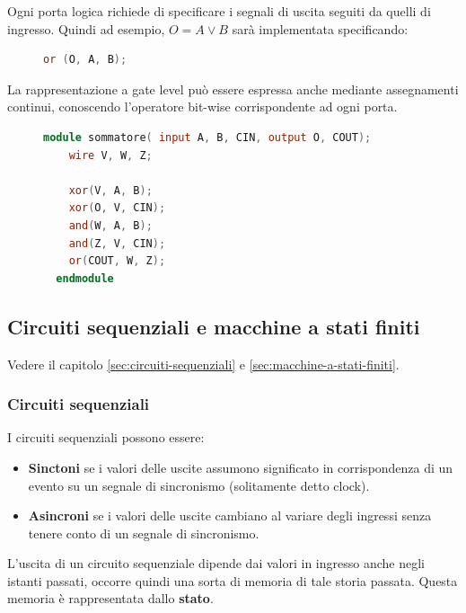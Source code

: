 \documentclass[a4paper]{article}
\theoremstyle{break}
\theoremstyle{break}
\theoremstyle{break}
\theoremstyle{break}
\begin{document}
Ogni porta logica richiede di specificare i segnali di uscita seguiti da quelli di ingresso.
Quindi ad esempio, \( O = A \vee B \) sarà implementata specificando:
\begin{figure}[H]
  \begin{lstlisting}[language=Verilog]
  or (O, A, B);
  \end{lstlisting}
\end{figure}
La rappresentazione a gate level può essere espressa anche mediante assegnamenti continui,
conoscendo l'operatore bit-wise corrispondente ad ogni porta.

\begin{figure}[H]
  \begin{example}
  \begin{lstlisting}[language=Verilog]
  module sommatore( input A, B, CIN, output O, COUT);
    wire V, W, Z;
    
    xor(V, A, B);
    xor(O, V, CIN);
    and(W, A, B);
    and(Z, V, CIN);
    or(COUT, W, Z);
  endmodule
  \end{lstlisting}
\end{example}
\end{figure}

\subsection{Circuiti sequenziali e macchine a stati finiti}
Vedere il capitolo \ref{sec:circuiti-sequenziali} e \ref{sec:macchine-a-stati-finiti}.
\subsubsection{Circuiti sequenziali}

I circuiti sequenziali possono essere:
\begin{itemize}
  \item \textbf{Sinctoni} se i valori delle uscite assumono significato in corrispondenza
    di un evento su un segnale di sincronismo (solitamente detto clock).
  \item \textbf{Asincroni} se i valori delle uscite cambiano al variare degli ingressi senza
    tenere conto di un segnale di sincronismo.
\end{itemize}
L’uscita di un circuito sequenziale dipende dai valori in ingresso anche negli
istanti passati, occorre quindi una sorta di memoria di tale storia passata.
Questa memoria è rappresentata dallo \textbf{stato}.
\end{document}
